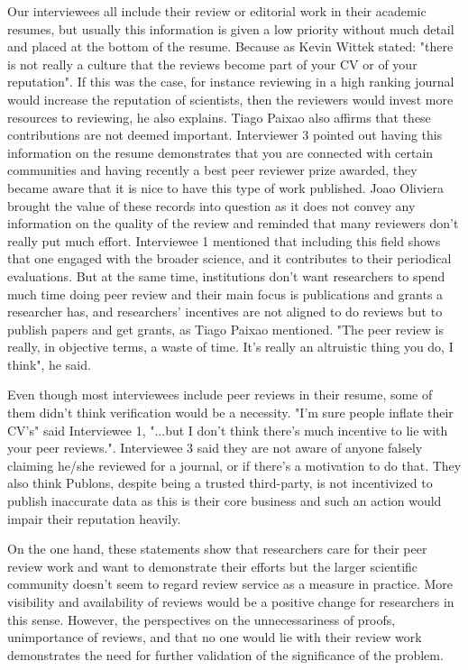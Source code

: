 Our interviewees all include their review or editorial work in their academic resumes, but usually this information is given a low priority without much detail and placed at the bottom of the resume. Because as Kevin Wittek stated: "there is not really a culture that the reviews become part of your CV or of your reputation". If this was the case, for instance reviewing in a high ranking journal would increase the reputation of scientists, then the reviewers would invest more resources to reviewing, he also explains. Tiago Paixao also affirms that these contributions are not deemed important. Interviewer 3 pointed out having this information on the resume demonstrates that you are connected with certain communities and having recently a best peer reviewer prize awarded, they became aware that it is nice to have this type of work published. Joao Oliviera brought the value of these records into question as it does not convey any information on the quality of the review and reminded that many reviewers don't really put much effort. Interviewee 1 mentioned that including this field shows that one engaged with the broader science, and it contributes to their periodical evaluations. But at the same time, institutions don't want researchers to spend much time doing peer review and their main focus is publications and grants a researcher has, and researchers' incentives are not aligned to do reviews but to publish papers and get grants, as Tiago Paixao mentioned. "The peer review is really, in objective terms, a waste of time. It's really an altruistic thing you do, I think", he said.

Even though most interviewees include peer reviews in their resume, some of them didn't think verification would be a necessity. "I'm sure people inflate their CV's" said Interviewee 1, "...but I don't think there's much incentive to lie with your peer reviews.". Interviewee 3 said they are not aware of anyone falsely claiming he/she reviewed for a journal, or if there's a motivation to do that. They also think Publons, despite being a trusted third-party, is not incentivized to publish inaccurate data as this is their core business and such an action would impair their reputation heavily. 

On the one hand, these statements show that researchers care for their peer review work and want to demonstrate their efforts but the larger scientific community doesn't seem to regard review service as a measure in practice. More visibility and availability of reviews would be a positive change for researchers in this sense. However, the perspectives on the unnecessariness of proofs, unimportance of reviews, and that no one would lie with their review work demonstrates the need for further validation of the significance of the problem.

